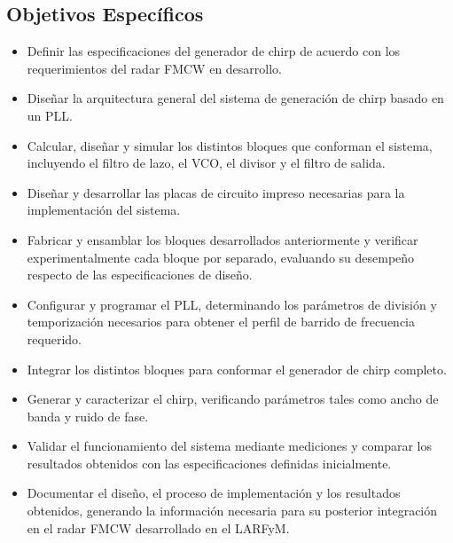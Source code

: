 \subsection{Objetivos Específicos}
\begin{itemize}
    \item Definir las especificaciones del generador de chirp de acuerdo con los requerimientos del radar FMCW en desarrollo.
    \item Diseñar la arquitectura general del sistema de generación de chirp basado en un PLL.
    \item Calcular, diseñar y simular los distintos bloques que conforman el sistema, incluyendo el filtro de lazo, el VCO, el divisor y el filtro de salida.
    \item Diseñar y desarrollar las placas de circuito impreso necesarias para la implementación del sistema.
    \item Fabricar y ensamblar los bloques desarrollados anteriormente y verificar experimentalmente cada bloque por separado, evaluando su desempeño respecto de las especificaciones de diseño.
    \item Configurar y programar el PLL, determinando los parámetros de división y temporización necesarios para obtener el perfil de barrido de frecuencia requerido.
    \item Integrar los distintos bloques para conformar el generador de chirp completo.
    \item Generar y caracterizar el chirp, verificando parámetros tales como ancho de banda y ruido de fase.
    \item Validar el funcionamiento del sistema mediante mediciones y comparar los resultados obtenidos con las especificaciones definidas inicialmente.
    \item Documentar el diseño, el proceso de implementación y los resultados obtenidos, generando la información necesaria para su posterior integración en el radar FMCW desarrollado en el LARFyM.
\end{itemize}

